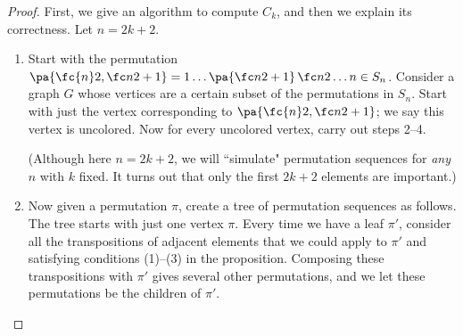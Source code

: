 \documentclass[12pt, reqno]{amsart}
\begin{document}

\begin{proof}
First, we give an algorithm to compute $C_k$, and then we explain its correctness. Let $n=2k+2$. 
\begin{enumerate}
\item
Start with the permutation $\pa{\fc{n}2,\fc n2+1}=1\ldots \pa{\fc n2+1} \,\fc n2\ldots n\in S_n$. Consider a graph $G$ whose vertices are a certain subset of the permutations in $S_n$. Start with just the vertex corresponding to $\pa{\fc{n}2,\fc n2+1}$; we say this vertex is uncolored. Now for every uncolored vertex, carry out steps 2--4.

(Although here $n=2k+2$, we will ``simulate" permutation sequences for {\it any} $n$ with $k$ fixed. It turns out that only the first $2k+2$ elements are important.)
\item
Now given a permutation $\pi$, create a tree of permutation sequences as follows. The tree starts with just one vertex $\pi$. Every time we have a leaf $\pi'$, consider all the transpositions of adjacent elements that we could apply to $\pi'$ and satisfying conditions (1)--(3) in the proposition. Composing these transpositions with $\pi'$ gives several other permutations, and we let these permutations be the children of $\pi'$.


\end{enumerate}
\end{proof}
\end{document}
